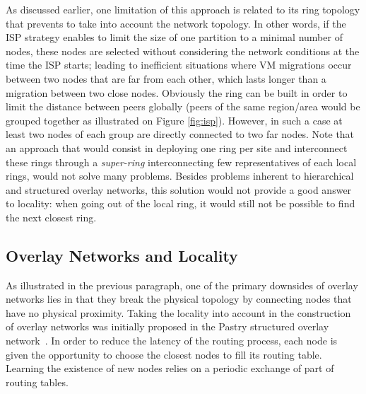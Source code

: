 As discussed earlier, one limitation of this approach is related to its ring topology that prevents to take into account the network topology. 
%
%
%
In other words, if the ISP strategy enables to limit the size of one partition to a minimal number of nodes, these nodes are selected without considering 
the network conditions at the time the ISP starts; leading to inefficient situations where VM migrations occur between two nodes that are far from each other, 
which lasts longer than a migration between two close nodes. Obviously the ring can
be built in order to limit the distance between peers globally (\ie peers of
the same region/area would be grouped together as illustrated on Figure \ref{fig:isp}). However, in such a case at least two nodes of each group are directly connected to 
two far nodes. 
%
Note that an approach that would consist in deploying one ring per site and
interconnect these rings through a \emph{super-ring} interconnecting few
representatives of each local rings, would not solve many problems. Besides
problems inherent to hierarchical and structured overlay networks, this solution
would not provide a good answer to locality: when going out of the local ring,
it would still not be possible to find the next closest ring.
%


\subsection{Overlay Networks and Locality}

As illustrated in the previous paragraph, one of the primary downsides of
overlay networks lies in that they break the physical topology by connecting
nodes that have no physical proximity.
%
Taking the locality into account in the construction of overlay networks was
initially proposed in the Pastry structured overlay network~\cite{pastry}. In
order to reduce the latency of the routing process, each node is given the
opportunity to choose the closest nodes to fill its routing table. Learning the
existence of new nodes relies on a periodic exchange of part of routing tables.

